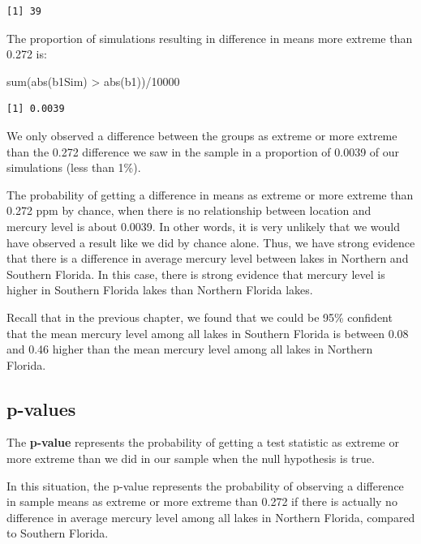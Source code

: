 \documentclass[
  letterpaper,
  DIV=11,
  numbers=noendperiod]{scrreprt}
\newenvironment{Shaded}{\begin{snugshade}}{\end{snugshade}}
\newcommand{\DecValTok}[1]{\textcolor[rgb]{0.68,0.00,0.00}{#1}}
\newcommand{\FunctionTok}[1]{\textcolor[rgb]{0.28,0.35,0.67}{#1}}
\newcommand{\NormalTok}[1]{\textcolor[rgb]{0.00,0.23,0.31}{#1}}
\newcommand{\SpecialCharTok}[1]{\textcolor[rgb]{0.37,0.37,0.37}{#1}}
\begin{document}
\begin{verbatim}
[1] 39
\end{verbatim}

The proportion of simulations resulting in difference in means more
extreme than 0.272 is:

\begin{Shaded}
\begin{Highlighting}[]
\FunctionTok{sum}\NormalTok{(}\FunctionTok{abs}\NormalTok{(b1Sim) }\SpecialCharTok{\textgreater{}} \FunctionTok{abs}\NormalTok{(b1))}\SpecialCharTok{/}\DecValTok{10000}
\end{Highlighting}
\end{Shaded}

\begin{verbatim}
[1] 0.0039
\end{verbatim}

We only observed a difference between the groups as extreme or more
extreme than the 0.272 difference we saw in the sample in a proportion
of 0.0039 of our simulations (less than 1\%).

The probability of getting a difference in means as extreme or more
extreme than 0.272 ppm by chance, when there is no relationship between
location and mercury level is about 0.0039. In other words, it is very
unlikely that we would have observed a result like we did by chance
alone. Thus, we have strong evidence that there is a difference in
average mercury level between lakes in Northern and Southern Florida. In
this case, there is strong evidence that mercury level is higher in
Southern Florida lakes than Northern Florida lakes.

Recall that in the previous chapter, we found that we could be 95\%
confident that the mean mercury level among all lakes in Southern
Florida is between 0.08 and 0.46 higher than the mean mercury level
among all lakes in Northern Florida.

\subsection{p-values}\label{p-values}

The \textbf{p-value} represents the probability of getting a test
statistic as extreme or more extreme than we did in our sample when the
null hypothesis is true.

In this situation, the p-value represents the probability of observing a
difference in sample means as extreme or more extreme than 0.272 if
there is actually no difference in average mercury level among all lakes
in Northern Florida, compared to Southern Florida.
\end{document}
